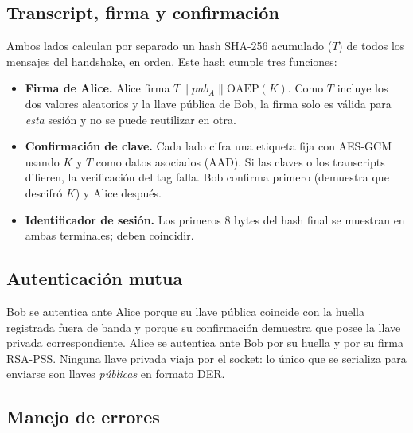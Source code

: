 \documentclass[11pt,a4paper]{article}
\theoremstyle{definition}
\theoremstyle{remark}
\begin{document}
\subsection{Transcript, firma y confirmación}
\label{subsec:confirmacion}

Ambos lados calculan por separado un hash SHA-256 acumulado ($T$) de todos
los mensajes del handshake, en orden. Este hash cumple tres funciones:

\begin{itemize}
  \item \textbf{Firma de Alice.} Alice firma $T \| pub_A \| \mathrm{OAEP}(K)$.
        Como $T$ incluye los dos valores aleatorios y la llave pública de
        Bob, la firma solo es válida para \emph{esta} sesión y no se puede
        reutilizar en otra.
  \item \textbf{Confirmación de clave.} Cada lado cifra una etiqueta fija
        con AES-GCM usando $K$ y $T$ como datos asociados (AAD). Si las
        claves o los transcripts difieren, la verificación del tag falla.
        Bob confirma primero (demuestra que descifró $K$) y Alice después.
  \item \textbf{Identificador de sesión.} Los primeros 8 bytes del hash
        final se muestran en ambas terminales; deben coincidir.
\end{itemize}

\subsection{Autenticación mutua}
\label{subsec:autmutua}

Bob se autentica ante Alice porque su llave pública coincide con la huella
registrada fuera de banda y porque su confirmación demuestra que posee la
llave privada correspondiente. Alice se autentica ante Bob por su huella y
por su firma RSA-PSS. Ninguna llave privada viaja por el socket: lo único
que se serializa para enviarse son llaves \emph{públicas} en formato DER.

\subsection{Manejo de errores}
\label{subsec:erroreshs}
\end{document}
